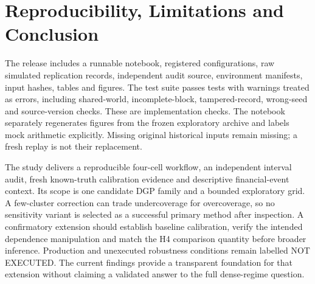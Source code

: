 \documentclass[conference]{IEEEtran}
\begin{document}
\section{Reproducibility, Limitations and Conclusion}
The release includes a runnable notebook, registered configurations, raw simulated replication records, independent audit source, environment manifests, input hashes, tables and figures. \ArchiveSummary{} The test suite passes \TestCount{} tests with warnings treated as errors, including shared-world, incomplete-block, tampered-record, wrong-seed and source-version checks. These are implementation checks. The notebook separately regenerates figures from the frozen exploratory archive and labels mock arithmetic explicitly. Missing original historical inputs remain missing; a fresh replay is not their replacement.

The study delivers a reproducible four-cell workflow, an independent interval audit, fresh known-truth calibration evidence and descriptive financial-event context. Its scope is one candidate DGP family and a bounded exploratory grid. A few-cluster correction can trade undercoverage for overcoverage, so no sensitivity variant is selected as a successful primary method after inspection. A confirmatory extension should establish baseline calibration, verify the intended dependence manipulation and match the H4 comparison quantity before broader inference. Production and unexecuted robustness conditions remain labelled NOT EXECUTED. The current findings provide a transparent foundation for that extension without claiming a validated answer to the full dense-regime question.
\end{document}
